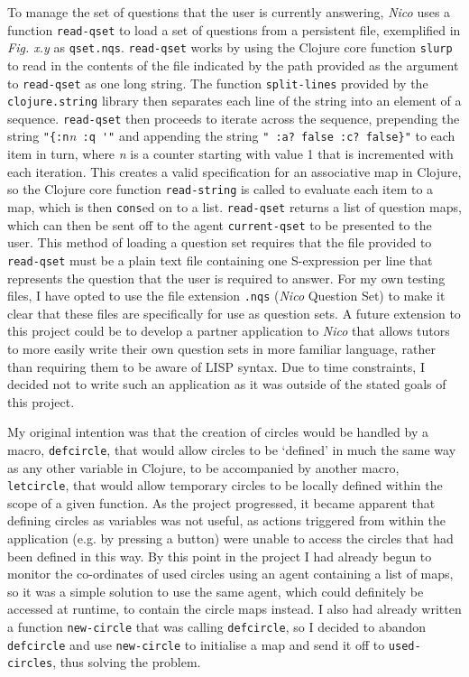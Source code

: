 \documentclass[12pt,twoside,notitlepage,xetex]{report}
\begin{document}
To manage the set of questions that the user is currently answering,
\emph{Nico} uses a function \verb¬read-qset¬ to load a set of questions from a
persistent file, exemplified in \emph{Fig. x.y} as \verb¬qset.nqs¬.
\verb¬read-qset¬ works by using the Clojure core function \verb¬slurp¬ to read
in the contents of the file indicated by the path provided as the argument to
\verb¬read-qset¬ as one long string.  The function \verb¬split-lines¬ provided
by the \verb¬clojure.string¬ library then separates each line of the string
into an element of a sequence.  \verb¬read-qset¬ then proceeds to iterate
across the sequence, prepending the string \verb¬"{:n¬\emph{n}\verb¬ :q '"¬ and
appending the string \verb¬" :a? false :c? false}"¬ to each item in turn, where
\emph{n} is a counter starting with value 1 that is incremented with each
iteration.  This creates a valid specification for an associative map in
Clojure, so the Clojure core function \verb¬read-string¬ is called to evaluate
each item to a map, which is then \verb¬cons¬ed on to a list.  \verb¬read-qset¬
returns a list of question maps, which can then be sent off to the agent
\verb¬current-qset¬ to be presented to the user.  This method of loading a
question set requires that the file provided to \verb¬read-qset¬ must be a
plain text file containing one S-expression per line that represents the
question that the user is required to answer.  For my own testing files, I have
opted to use the file extension \verb¬.nqs¬ (\emph{Nico} Question Set) to make
it clear that these files are specifically for use as question sets.  A future
extension to this project could be to develop a partner application to
\emph{Nico} that allows tutors to more easily write their own question sets in
more familiar language, rather than requiring them to be aware of LISP syntax.
Due to time constraints, I decided not to write such an application as it was
outside of the stated goals of this project.


My original intention was that the creation of circles would be handled by a
macro, \verb¬defcircle¬,  that would allow circles to be `defined' in much the
same way as any other variable in Clojure, to be accompanied by another macro,
\verb¬letcircle¬, that would allow temporary circles to be locally defined
within the scope of a given function.  As the project progressed, it became
apparent that defining circles as variables was not useful, as actions
triggered from within the application (e.g. by pressing a button) were unable
to access the circles that had been defined in this way.  By this point in the
project I had already begun to monitor the co-ordinates of used circles using
an agent containing a list of maps, so it was a simple solution to use the same
agent, which could definitely be accessed at runtime, to contain the circle
maps instead.  I also had already written a function \verb¬new-circle¬ that was
calling \verb¬defcircle¬, so I decided to abandon \verb¬defcircle¬ and use
\verb¬new-circle¬ to initialise a map and send it off to \verb¬used-circles¬,
thus solving the problem.
\end{document}
